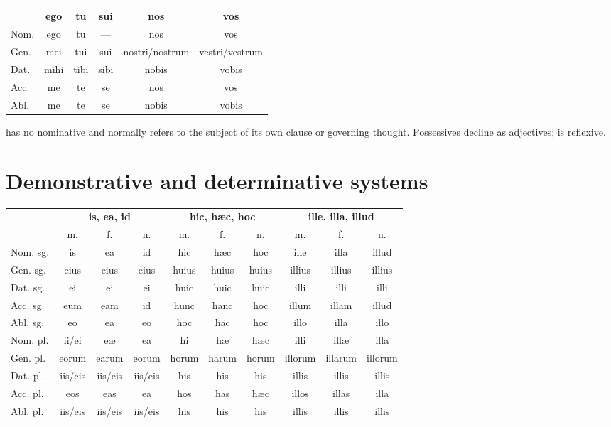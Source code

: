 \begin{center}\small
\begin{tabular}{@{}lccccc@{}}
  \toprule & ego & tu & sui & nos & vos \\
  \midrule
  Nom. & ego & tu & --- & nos & vos \\
  Gen. & mei & tui & sui & nostri/nostrum & vestri/vestrum \\
  Dat. & mihi & tibi & sibi & nobis & vobis \\
  Acc. & me & te & se & nos & vos \\
  Abl. & me & te & se & nobis & vobis \\
  \bottomrule
\end{tabular}
\end{center}

 has no nominative and normally refers to the subject of
its own clause or governing thought. Possessives  decline as adjectives;  is reflexive.

\section{Demonstrative and determinative systems}

\begin{center}\scriptsize
\begin{tabular}{@{}lccc|ccc|ccc@{}}
  \toprule & \multicolumn{3}{c|}{\textbf{is, ea, id}} &
  \multicolumn{3}{c|}{\textbf{hic, hæc, hoc}} &
  \multicolumn{3}{c}{\textbf{ille, illa, illud}} \\
  & m. & f. & n. & m. & f. & n. & m. & f. & n. \\
  \midrule
  Nom. sg. & is & ea & id & hic & hæc & hoc & ille & illa & illud \\
  Gen. sg. & eius & eius & eius & huius & huius & huius & illius & illius & illius \\
  Dat. sg. & ei & ei & ei & huic & huic & huic & illi & illi & illi \\
  Acc. sg. & eum & eam & id & hunc & hanc & hoc & illum & illam & illud \\
  Abl. sg. & eo & ea & eo & hoc & hac & hoc & illo & illa & illo \\
  Nom. pl. & ii/ei & eæ & ea & hi & hæ & hæc & illi & illæ & illa \\
  Gen. pl. & eorum & earum & eorum & horum & harum & horum & illorum & illarum & illorum \\
  Dat. pl. & iis/eis & iis/eis & iis/eis & his & his & his & illis & illis & illis \\
  Acc. pl. & eos & eas & ea & hos & has & hæc & illos & illas & illa \\
  Abl. pl. & iis/eis & iis/eis & iis/eis & his & his & his & illis & illis & illis \\
  \bottomrule
\end{tabular}
\end{center}

